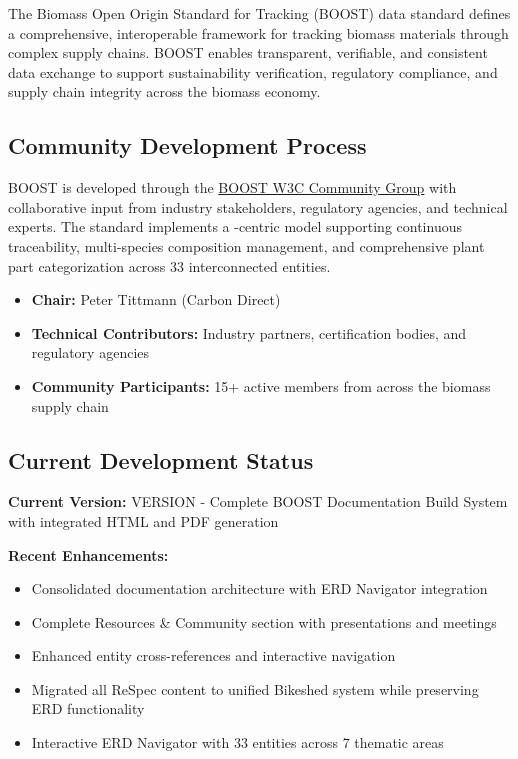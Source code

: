 
The Biomass Open Origin Standard for Tracking (BOOST) data standard defines a comprehensive, interoperable framework for tracking biomass materials through complex supply chains. BOOST enables transparent, verifiable, and consistent data exchange to support sustainability verification, regulatory compliance, and supply chain integrity across the biomass economy.

\subsection{Community Development Process}
\label{sec:community-development-process}

BOOST is developed through the \href{https://www.w3.org/community/boost-01/}{BOOST W3C Community Group} with collaborative input from industry stakeholders, regulatory agencies, and technical experts. The standard implements a \TRU-centric model supporting continuous traceability, multi-species composition management, and comprehensive plant part categorization across 33 interconnected entities.

\begin{informative}[title=Working Group Leadership]
\begin{itemize}
    \item \textbf{Chair:} Peter Tittmann (Carbon Direct)
    \item \textbf{Technical Contributors:} Industry partners, certification bodies, and regulatory agencies  
    \item \textbf{Community Participants:} 15+ active members from across the biomass supply chain
\end{itemize}
\end{informative}

\subsection{Current Development Status}
\label{sec:development-status}

\begin{important}[title=Current Version Information]
\textbf{Current Version:} {{VERSION}} - Complete BOOST Documentation Build System with integrated HTML and PDF generation

\textbf{Recent Enhancements:}
\begin{itemize}
    \item Consolidated documentation architecture with ERD Navigator integration
    \item Complete Resources \& Community section with presentations and meetings
    \item Enhanced entity cross-references and interactive navigation  
    \item Migrated all ReSpec content to unified Bikeshed system while preserving ERD functionality
    \item Interactive ERD Navigator with 33 entities across 7 thematic areas
\end{itemize}
\end{important}

